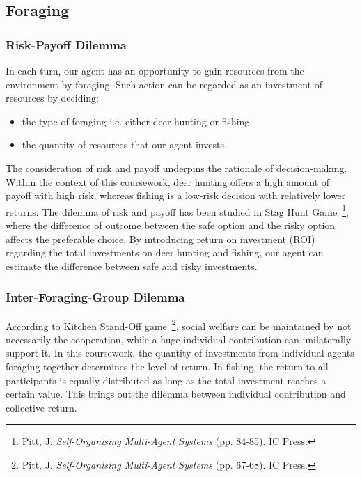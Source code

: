 
\subsection{Foraging} \label{subsec:Team6_Foraging}
\subsubsection{Risk-Payoff Dilemma} \label{subsubsec:Team6_Foraging:RP_dilemma}
In each turn, our agent has an opportunity to gain resources from the environment by foraging. Such action can be regarded as an investment of resources by deciding:
\begin{itemize}
    \item the type of foraging i.e. either deer hunting or fishing.
    \item the quantity of resources that our agent invests.
\end{itemize}
The consideration of risk and payoff underpins the rationale of decision-making. Within the context of this coursework, deer hunting offers a high amount of payoff with high risk, whereas fishing is a low-risk decision with relatively lower returns. The dilemma of risk and payoff has been studied in Stag Hunt Game~\footnote{Pitt, J. \textit{Self-Organising Multi-Agent Systems} (pp. 84-85). IC Press.}, where the difference of outcome between the safe option and the risky option affects the preferable choice. By introducing return on investment (ROI) regarding the total investments on deer hunting and fishing, our agent can estimate the difference between safe and risky investments.

\subsubsection{Inter-Foraging-Group Dilemma} \label{subsubsec:Team6_Foraging:Group_dilemma}

According to Kitchen Stand-Off game~\footnote{Pitt, J. \textit{Self-Organising Multi-Agent Systems} (pp. 67-68). IC Press.}, social welfare can be maintained by not necessarily the cooperation, while a huge individual contribution can unilaterally support it. In this coursework, the quantity of investments from individual agents foraging together determines the level of return. In fishing, the return to all participants is equally distributed as long as the total investment reaches a certain value. This brings out the dilemma between individual contribution and collective return. 

